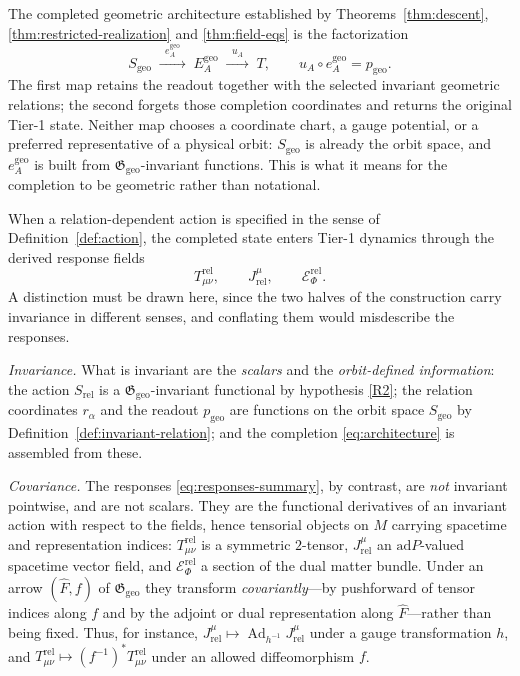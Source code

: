 \documentclass[11pt,a4paper]{article}
\theoremstyle{plain}
\theoremstyle{definition}
\theoremstyle{remark}
\newcommand{\Ggeo}{\mathfrak{G}_{\mathrm{geo}}}
\newcommand{\Sgeo}{S_{\mathrm{geo}}}
\newcommand{\Ad}{\operatorname{Ad}}
\newcommand{\Egeo}{E_A^{\mathrm{geo}}}
\newcommand{\pgeo}{p_{\mathrm{geo}}}
\newcommand{\egeo}{e_A^{\mathrm{geo}}}
\begin{document}
The completed geometric architecture established by Theorems~\ref{thm:descent},
\ref{thm:restricted-realization} and \ref{thm:field-eqs} is the factorization
\begin{equation}
\label{eq:architecture}
\Sgeo
\;\xrightarrow{\;\;\egeo\;\;}\;
\Egeo
\;\xrightarrow{\;\;u_A\;\;}\;
T ,
\qquad
u_A\circ\egeo=\pgeo .
\end{equation}
The first map retains the readout together with the selected invariant geometric relations; the
second forgets those completion coordinates and returns the original Tier-1 state. Neither map
chooses a coordinate chart, a gauge potential, or a preferred representative of a physical orbit:
$\Sgeo$ is already the orbit space, and $\egeo$ is built from $\Ggeo$-invariant functions. This is
what it means for the completion to be geometric rather than notational.

When a relation-dependent action is specified in the sense of Definition~\ref{def:action}, the
completed state enters Tier-1 dynamics through the derived response fields
\begin{equation}
\label{eq:responses-summary}
T^{\mathrm{rel}}_{\mu\nu},
\qquad
J^{\mu}_{\mathrm{rel}},
\qquad
\mathcal{E}^{\mathrm{rel}}_{\Phi} .
\end{equation}
A distinction must be drawn here, since the two halves of the construction carry invariance in
different senses, and conflating them would misdescribe the responses.

\emph{Invariance.} What is invariant are the \emph{scalars} and the \emph{orbit-defined
information}: the action $S_{\mathrm{rel}}$ is a $\Ggeo$-invariant functional by hypothesis
\ref{R2}; the relation coordinates $r_\alpha$ and the readout $\pgeo$ are functions on the orbit
space $\Sgeo$ by Definition~\ref{def:invariant-relation}; and the completion \eqref{eq:architecture}
is assembled from these.

\emph{Covariance.} The responses \eqref{eq:responses-summary}, by contrast, are \emph{not} invariant
pointwise, and are not scalars. They are the functional derivatives of an invariant action with
respect to the fields, hence tensorial objects on $M$ carrying spacetime and representation indices:
$T^{\mathrm{rel}}_{\mu\nu}$ is a symmetric $2$-tensor, $J^{\mu}_{\mathrm{rel}}$ an
$\mathrm{ad}P$-valued spacetime vector field, and $\mathcal{E}^{\mathrm{rel}}_{\Phi}$ a section of
the dual matter bundle. Under an arrow $(\hat F,f)$ of $\Ggeo$ they transform \emph{covariantly}---by pushforward of
tensor indices along $f$ and by the adjoint or dual representation along $\hat F$---rather than
being fixed. Thus, for instance, $J^{\mu}_{\mathrm{rel}}\mapsto \Ad_{h^{-1}}J^{\mu}_{\mathrm{rel}}$
under a gauge transformation $h$, and $T^{\mathrm{rel}}_{\mu\nu}\mapsto (f^{-1})^{*}
T^{\mathrm{rel}}_{\mu\nu}$ under an allowed diffeomorphism $f$.
\end{document}
